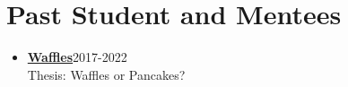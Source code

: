 \section{Past Student and Mentees}
\begin{itemize}
[leftmargin=0pt,parsep=3pt,itemsep=0pt,topsep=0pt,partopsep=0pt]

\item[] \href{www.waffles.com}{\textbf{Waffles}}\hfill {2017-2022}\\Thesis: Waffles or Pancakes?

\end{itemize}